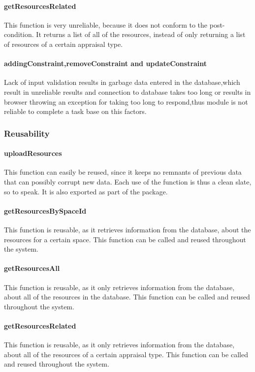 \documentclass[a4paper]{article}
\begin{document}
\paragraph{getResourcesRelated}
This function is very unreliable, because it does not conform to the post-condition. It returns a list of all of the resources, instead of only returning a list of resources of a certain appraisal type.

\paragraph{addingConstraint,removeConstraint and updateConstraint}
Lack of input validation results in garbage data entered in the database,which result in unreliable results and connection to database takes too long or results in browser throwing an exception for taking too long to respond,thus module is not reliable to complete a task base on this factors.


\subsubsection {Reusability}

\paragraph{uploadResources}
This function can easily be reused, since it keeps no remnants of previous data that can possibly corrupt new data. Each use of the function is thus a clean slate, so to speak. It is also exported as part of the package.

\paragraph{getResourcesBySpaceId}
This function is reusable, as it retrieves information from the database, about the resources for a certain space. This function can be called and reused throughout the system.

\paragraph{getResourcesAll}
This function is reusable, as it only retrieves information from the database, about all of the resources in the database. This function can be called and reused throughout the system.

\paragraph{getResourcesRelated}
This function is reusable, as it only retrieves information from the database, about all of the resources of a certain appraisal type. This function can be called and reused throughout the system.
\end{document}
